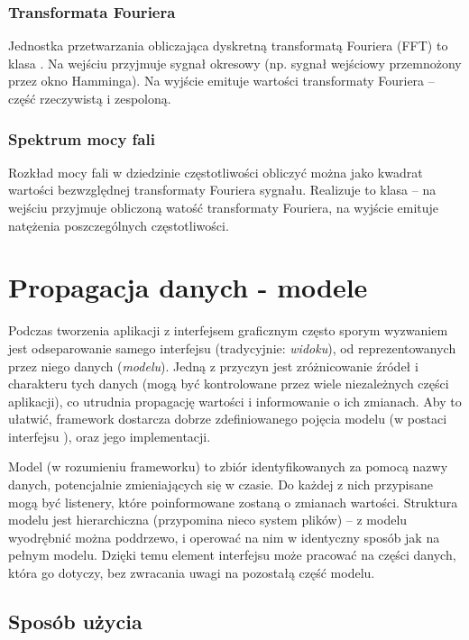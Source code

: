 \subsubsection{Transformata Fouriera}

Jednostka przetwarzania obliczająca dyskretną transformatą Fouriera (FFT) to klasa . Na
wejściu przyjmuje sygnał okresowy (np. sygnał wejściowy przemnożony przez okno Hamminga). Na wyjście
emituje wartości transformaty Fouriera -- część rzeczywistą i zespoloną.

\subsubsection{Spektrum mocy fali}

Rozkład mocy fali w dziedzinie częstotliwości obliczyć można jako kwadrat wartości bezwzględnej
transformaty Fouriera sygnału. Realizuje to klasa  -- na wejściu przyjmuje
obliczoną watość transformaty Fouriera, na wyjście emituje natężenia poszczególnych częstotliwości.


\section{Propagacja danych - modele}

Podczas tworzenia aplikacji z interfejsem graficznym często sporym wyzwaniem jest odseparowanie
samego interfejsu (tradycyjnie: \emph{widoku}), od reprezentowanych przez niego danych
(\emph{modelu}). Jedną z przyczyn jest zróżnicowanie źródeł i charakteru tych danych (mogą być
kontrolowane przez wiele niezależnych części aplikacji), co utrudnia propagację wartości i
informowanie o ich zmianach. Aby to ułatwić, framework dostarcza dobrze zdefiniowanego pojęcia
modelu (w postaci interfejsu ), oraz jego implementacji.

Model (w rozumieniu frameworku) to zbiór identyfikowanych za pomocą nazwy danych, potencjalnie
zmieniających się w czasie. Do każdej z nich przypisane mogą być listenery, które poinformowane
zostaną o zmianach wartości. Struktura modelu jest hierarchiczna (przypomina nieco system plików) --
z modelu wyodrębnić można poddrzewo, i operować na nim w identyczny sposób jak na pełnym modelu.
Dzięki temu element interfejsu może pracować na części danych, która go dotyczy, bez zwracania uwagi
na pozostałą część modelu.

\subsection{Sposób użycia}


